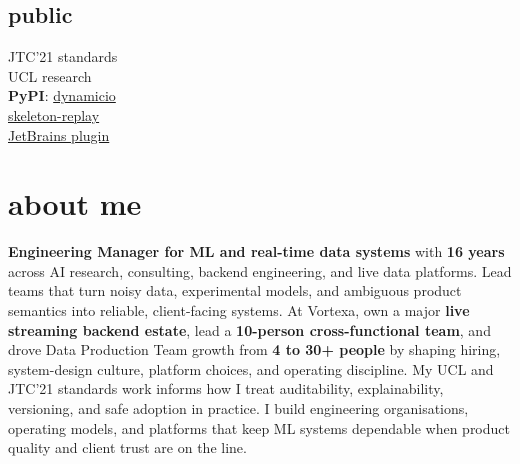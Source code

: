 \documentclass[]{../../friggeri-cv}
\begin{document}
\begin{aside}
			\section{public}
			{\footnotesize JTC'21 standards\\UCL research\\\textbf{PyPI}: \href{https://pypi.org/project/dynamicio/}{dynamicio}\\\href{https://pypi.org/project/skeleton-replay/}{skeleton-replay}\\\href{https://plugins.jetbrains.com/plugin/32807-skeleton-replay}{JetBrains plugin}}
	\end{aside}

\section{about me}
{\small \textbf{Engineering Manager for ML and real-time data systems} with \textbf{16 years} across AI research, consulting, backend engineering, and live data platforms. Lead teams that turn noisy data, experimental models, and ambiguous product semantics into reliable, client-facing systems. At Vortexa, own a major \textbf{live streaming backend estate}, lead a \textbf{10-person cross-functional team}, and drove Data Production Team growth from \textbf{4 to 30+ people} by shaping hiring, system-design culture, platform choices, and operating discipline. My UCL and JTC'21 standards work informs how I treat auditability, explainability, versioning, and safe adoption in practice. I build engineering organisations, operating models, and platforms that keep ML systems dependable when product quality and client trust are on the line.}
\end{document}
